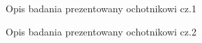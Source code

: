 \documentclass{./assets/wfis}
\begin{document}
\begin{figure}[h!]
    \centering
    \caption{Opis badania prezentowany ochotnikowi cz.1}
    \label{opis-badania}
\end{figure}

\begin{figure}[h!]
    \centering
    \caption{Opis badania prezentowany ochotnikowi cz.2}
    \label{zgoda-na-przetwarzanie-danych}
\end{figure}
\end{document}
